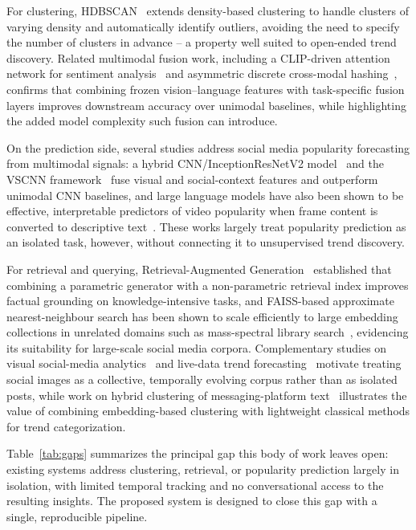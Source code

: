 \documentclass[conference]{IEEEtran}
\begin{document}
For clustering, HDBSCAN~\cite{hdbscan} extends density-based clustering to handle clusters of varying density and automatically identify outliers, avoiding the need to specify the number of clusters in advance -- a property well suited to open-ended trend discovery. Related multimodal fusion work, including a CLIP-driven attention network for sentiment analysis~\cite{cdan} and asymmetric discrete cross-modal hashing~\cite{adch}, confirms that combining frozen vision--language features with task-specific fusion layers improves downstream accuracy over unimodal baselines, while highlighting the added model complexity such fusion can introduce.

On the prediction side, several studies address social media popularity forecasting from multimodal signals: a hybrid CNN/InceptionResNetV2 model~\cite{multimodal_pop} and the VSCNN framework~\cite{vscnn,mmspp} fuse visual and social-context features and outperform unimodal CNN baselines, and large language models have also been shown to be effective, interpretable predictors of video popularity when frame content is converted to descriptive text~\cite{llm_video}. These works largely treat popularity prediction as an isolated task, however, without connecting it to unsupervised trend discovery.

For retrieval and querying, Retrieval-Augmented Generation~\cite{rag} established that combining a parametric generator with a non-parametric retrieval index improves factual grounding on knowledge-intensive tasks, and FAISS-based approximate nearest-neighbour search has been shown to scale efficiently to large embedding collections in unrelated domains such as mass-spectral library search~\cite{faiss_search}, evidencing its suitability for large-scale social media corpora. Complementary studies on visual social-media analytics~\cite{visual_models} and live-data trend forecasting~\cite{instagram_forecast} motivate treating social images as a collective, temporally evolving corpus rather than as isolated posts, while work on hybrid clustering of messaging-platform text~\cite{telegram} illustrates the value of combining embedding-based clustering with lightweight classical methods for trend categorization.

Table~\ref{tab:gaps} summarizes the principal gap this body of work leaves open: existing systems address clustering, retrieval, or popularity prediction largely in isolation, with limited temporal tracking and no conversational access to the resulting insights. The proposed system is designed to close this gap with a single, reproducible pipeline.
\end{document}
